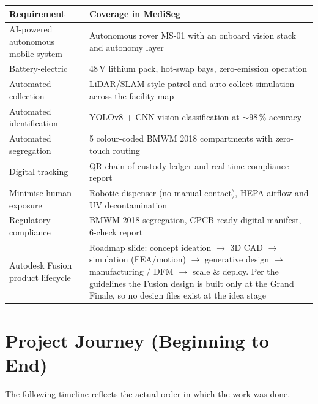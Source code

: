 \documentclass[11pt, a4paper]{article}
\begin{document}
\begin{tabularx}{\textwidth}{lX}
  \toprule
  \textbf{Requirement} & \textbf{Coverage in MediSeg}\\
  \midrule
  AI-powered autonomous mobile system &
    Autonomous rover MS-01 with an onboard vision stack and autonomy layer\\
  Battery-electric &
    48\,V lithium pack, hot-swap bays, zero-emission operation\\
  Automated collection &
    LiDAR/SLAM-style patrol and auto-collect simulation across the facility map\\
  Automated identification &
    YOLOv8 + CNN vision classification at $\sim$98\,\% accuracy\\
  Automated segregation &
    5 colour-coded BMWM 2018 compartments with zero-touch routing\\
  Digital tracking &
    QR chain-of-custody ledger and real-time compliance report\\
  Minimise human exposure &
    Robotic dispenser (no manual contact), HEPA airflow and UV decontamination\\
  Regulatory compliance &
    BMWM 2018 segregation, CPCB-ready digital manifest, 6-check report\\
  Autodesk Fusion product lifecycle &
    Roadmap slide: concept ideation $\rightarrow$ 3D CAD $\rightarrow$
    simulation (FEA/motion) $\rightarrow$ generative design $\rightarrow$
    manufacturing / DFM $\rightarrow$ scale \& deploy. Per the guidelines the
    Fusion design is built only at the Grand Finale, so no design files exist
    at the idea stage\\
  \bottomrule
\end{tabularx}

\section{Project Journey (Beginning to End)}

The following timeline reflects the actual order in which the work was done.
\end{document}
